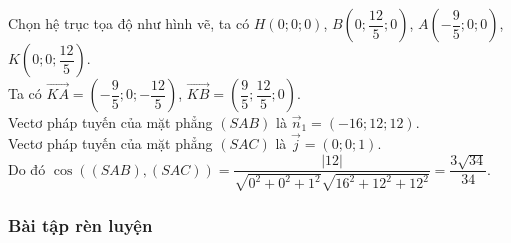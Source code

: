\begin{vd}
{{		}
		\noindent Chọn hệ trục tọa độ như hình vẽ, ta có $ H(0;0;0) $, $ B\left( 0;\dfrac{12}{5};0\right)  $, $ A\left( -\dfrac{9}{5};0;0 \right)  $, $ K\left( 0;0;\dfrac{12}{5} \right)  $.\\Ta có
		$ \vec{KA}=\left( -\dfrac{9}{5};0;-\dfrac{12}{5} \right)  $, $ \vec{KB}=\left( \dfrac{9}{5};\dfrac{12}{5};0 \right)  $.\\
		Vectơ pháp tuyến của mặt phẳng $ (SAB) $ là $ \vec{n}_1=\left( -16;12;12 \right) $.\\
		Vectơ pháp tuyến của mặt phẳng $ (SAC) $ là $ \vec{j}=(0;0;1) $.\\
		Do đó $ \cos((SAB),(SAC))=\dfrac{|12|}{\sqrt{0^2+0^2+1^2}\sqrt{16^2+12^2+12^2}}=\dfrac{3\sqrt{34}}{34}. $
	}
\end{vd}
\subsubsection{Bài tập rèn luyện}
